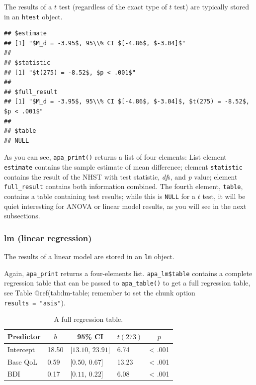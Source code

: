 \documentclass[man,floatsintext]{apa6}
\theoremstyle{definition}
\theoremstyle{definition}
\theoremstyle{definition}
\theoremstyle{remark}
\begin{document}
The results of a \(t\) test (regardless of the exact type of \(t\) test)
are typically stored in an \texttt{htest} object.

\begin{verbatim}
## $estimate
## [1] "$M_d = -3.95$, 95\\% CI $[-4.86$, $-3.04]$"
## 
## $statistic
## [1] "$t(275) = -8.52$, $p < .001$"
## 
## $full_result
## [1] "$M_d = -3.95$, 95\\% CI $[-4.86$, $-3.04]$, $t(275) = -8.52$, $p < .001$"
## 
## $table
## NULL
\end{verbatim}

As you can see, \texttt{apa\_print()} returns a list of four elements:
List element \texttt{estimate} contains the sample estimate of mean
difference; element \texttt{statistic} contains the result of the NHST
with test statistic, \emph{df}s, and \emph{p} value; element
\texttt{full\_result} contains both information combined. The fourth
element, \texttt{table}, contains a table containing test results; while
this is \texttt{NULL} for a \(t\) test, it will be quiet interesting for
ANOVA or linear model results, as you will see in the next subsections.

\subsubsection{lm (linear regression)}\label{lm-linear-regression}

The results of a linear model are stored in an \texttt{lm} object.

Again, \texttt{apa\_print} returns a four-elements list.
\texttt{apa\_lm\$table} contains a complete regression table that can be
passed to \texttt{apa\_table()} to get a full regression table, see
Table @ref(tab:lm-table; remember to set the chunk option
\texttt{results\ =\ "asis"}).

\begin{table}[tbp]
\begin{center}
\begin{threeparttable}
\caption{\label{tab:lm-table}A full regression table.}
\begin{tabular}{lllll}
\toprule
Predictor & \multicolumn{1}{c}{$b$} & \multicolumn{1}{c}{95\% CI} & \multicolumn{1}{c}{$t(273)$} & \multicolumn{1}{c}{$p$}\\
\midrule
Intercept & 18.50 & $[13.10$, $23.91]$ & 6.74 & < .001\\
Base QoL & 0.59 & $[0.50$, $0.67]$ & 13.23 & < .001\\
BDI & 0.17 & $[0.11$, $0.22]$ & 6.08 & < .001\\
\bottomrule
\end{tabular}
\end{threeparttable}
\end{center}
\end{table}
\end{document}
